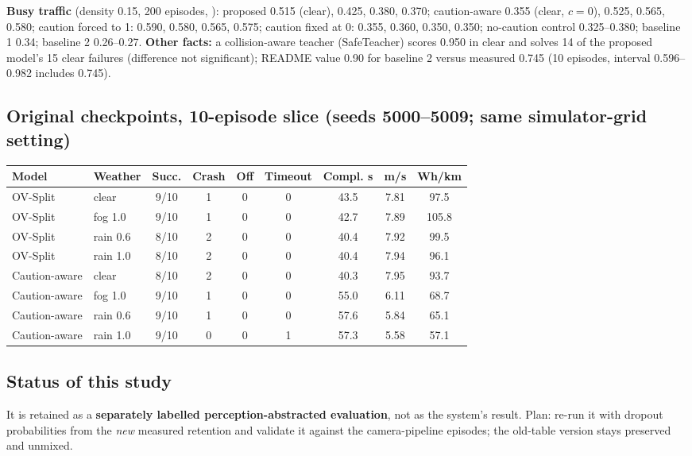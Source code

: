 \documentclass[10.5pt,a4paper]{article}
\newcommand{\code}[1]{\texttt{\detokenize{#1}}}
\begin{document}
\textbf{Busy traffic} (density 0.15, 200 episodes, \code{results/regime_confirm/d0.15}): proposed 0.515 (clear), 0.425, 0.380, 0.370; caution-aware 0.355 (clear, $c=0$), 0.525, 0.565, 0.580; caution forced to 1: 0.590, 0.580, 0.565, 0.575; caution fixed at 0: 0.355, 0.360, 0.350, 0.350; no-caution control 0.325--0.380; baseline 1 0.34; baseline 2 0.26--0.27.
\textbf{Other facts:} a collision-aware teacher (SafeTeacher) scores 0.950 in clear and solves 14 of the proposed model's 15 clear failures (difference not significant); README value 0.90 for baseline 2 versus measured 0.745 (10 episodes, interval 0.596--0.982 includes 0.745).
\subsection{Original checkpoints, 10-episode slice (seeds 5000--5009; same simulator-grid setting)}
\begin{center}\footnotesize\setlength{\tabcolsep}{3pt}\begin{tabular}{@{}llccccccc@{}}\toprule
Model & Weather & Succ. & Crash & Off & Timeout & Compl. s & m/s & Wh/km\\\midrule
OV-Split & clear & 9/10 & 1 & 0 & 0 & 43.5 & 7.81 & 97.5\\
OV-Split & fog 1.0 & 9/10 & 1 & 0 & 0 & 42.7 & 7.89 & 105.8\\
OV-Split & rain 0.6 & 8/10 & 2 & 0 & 0 & 40.4 & 7.92 & 99.5\\
OV-Split & rain 1.0 & 8/10 & 2 & 0 & 0 & 40.4 & 7.94 & 96.1\\
Caution-aware & clear & 8/10 & 2 & 0 & 0 & 40.3 & 7.95 & 93.7\\
Caution-aware & fog 1.0 & 9/10 & 1 & 0 & 0 & 55.0 & 6.11 & 68.7\\
Caution-aware & rain 0.6 & 9/10 & 1 & 0 & 0 & 57.6 & 5.84 & 65.1\\
Caution-aware & rain 1.0 & 9/10 & 0 & 0 & 1 & 57.3 & 5.58 & 57.1\\\bottomrule\end{tabular}\end{center}
\subsection{Status of this study}
It is retained as a \textbf{separately labelled perception-abstracted evaluation}, not as the system's result. Plan: re-run it with dropout probabilities from the \emph{new} measured retention and validate it against the camera-pipeline episodes; the old-table version stays preserved and unmixed.
\end{document}
